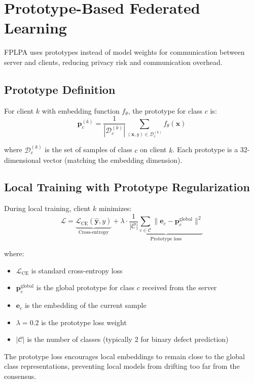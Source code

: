 \section{Prototype-Based Federated Learning}

FPLPA uses prototypes instead of model weights for communication between server and clients, reducing privacy risk and communication overhead.

\subsection{Prototype Definition}

For client \(k\) with embedding function \(f_\theta\), the prototype for class \(c\) is:
\[
\mathbf{p}_c^{(k)} = \frac{1}{|\mathcal{D}_c^{(k)}|} \sum_{(\mathbf{x}, y) \in \mathcal{D}_c^{(k)}} f_\theta(\mathbf{x})
\]

where \(\mathcal{D}_c^{(k)}\) is the set of samples of class \(c\) on client \(k\). Each prototype is a 32-dimensional vector (matching the embedding dimension).

\subsection{Local Training with Prototype Regularization}

During local training, client \(k\) minimizes:
\[
\mathcal{L} = \underbrace{\mathcal{L}_{\text{CE}}(\hat{\mathbf{y}}, y)}_{\text{Cross-entropy}} + \lambda \cdot \underbrace{\frac{1}{|\mathcal{C}|} \sum_{c \in \mathcal{C}} \|\mathbf{e}_c - \mathbf{p}_c^{\text{global}}\|^2}_{\text{Prototype loss}}
\]

where:
\begin{itemize}
    \item \(\mathcal{L}_{\text{CE}}\) is standard cross-entropy loss
    \item \(\mathbf{p}_c^{\text{global}}\) is the global prototype for class \(c\) received from the server
    \item \(\mathbf{e}_c\) is the embedding of the current sample
    \item \(\lambda = 0.2\) is the prototype loss weight
    \item \(|\mathcal{C}|\) is the number of classes (typically 2 for binary defect prediction)
\end{itemize}

The prototype loss encourages local embeddings to remain close to the global class representations, preventing local models from drifting too far from the consensus.

